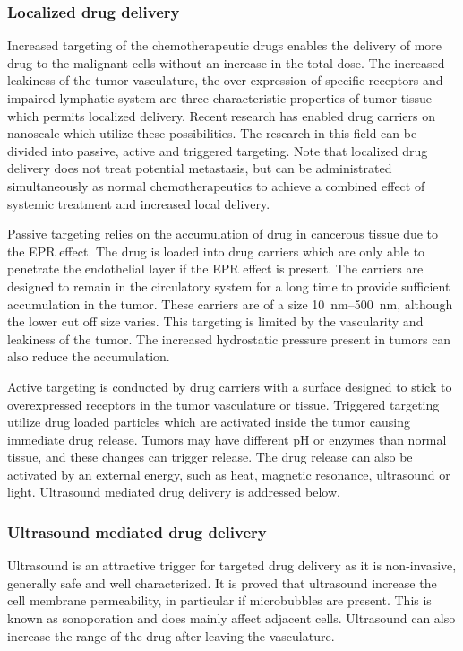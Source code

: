 \subsubsection{Localized drug delivery}
Increased targeting of the chemotherapeutic drugs enables the delivery of more drug to the malignant cells without an increase in the total dose. The increased leakiness of the tumor vasculature, the over-expression of specific receptors and impaired lymphatic system are three characteristic properties of tumor tissue which permits localized delivery. Recent research has enabled drug carriers on nanoscale which utilize these possibilities\cite{Jafari}. The research in this field can be divided into passive, active and triggered targeting. Note that localized drug delivery does not treat potential metastasis, but can be administrated simultaneously as normal chemotherapeutics to achieve a combined effect of systemic treatment and increased local delivery.

Passive targeting relies on the accumulation of drug in cancerous tissue due to the EPR effect. The drug is loaded into drug carriers which are only able to penetrate the endothelial layer if the EPR effect is present\cite{Andresen2010}. The carriers are designed to remain in the circulatory system for a long time to provide sufficient accumulation in the tumor. These carriers are of a size \SIrange{10}{500}{\nano\meter}, although the lower cut off size varies\cite{Hofmann}. This targeting is limited by the vascularity and leakiness of the tumor. The increased hydrostatic pressure present in tumors can also reduce the accumulation\cite{Bae2009}.  

Active targeting is conducted by drug carriers with a surface designed to stick to overexpressed receptors in the tumor vasculature or tissue. Triggered targeting utilize drug loaded particles which are activated inside the tumor causing immediate drug release. Tumors may have different pH or enzymes than normal tissue,  and these changes can trigger release. The drug release can also be activated by an external energy, such as heat, magnetic resonance, ultrasound or light\cite{Jafari}. Ultrasound mediated drug delivery is addressed below. 
	
\subsubsection{Ultrasound mediated drug delivery}
\label{sec:umdd}
Ultrasound is an attractive trigger for targeted drug delivery as it is non-invasive, generally safe and well characterized. It is proved that ultrasound increase the cell membrane permeability, in particular if microbubbles are present\cite{VanWamel2006a}. This is known as sonoporation and does mainly affect adjacent cells. Ultrasound can also increase the range of the drug after leaving the vasculature\cite{Eggen2013}.

